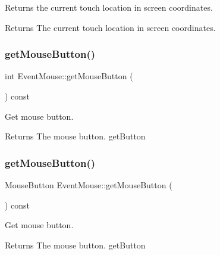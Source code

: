 Returns the current touch location in screen coordinates.

\begin{DoxyReturn}{Returns}
The current touch location in screen coordinates. 
\end{DoxyReturn}
\mbox{\label{classEventMouse_ac1f35c4723f32dbe0c8ccfcb8cc74e54}} 
\subsubsection{\texorpdfstring{get\+Mouse\+Button()}{getMouseButton()}\hspace{0.1cm}{\footnotesize\ttfamily [1/2]}}
{\footnotesize\ttfamily int Event\+Mouse\+::get\+Mouse\+Button (\begin{DoxyParamCaption}{ }\end{DoxyParamCaption}) const\hspace{0.3cm}{\ttfamily [inline]}}

Get mouse button.

\begin{DoxyReturn}{Returns}
The mouse button.  get\+Button 
\end{DoxyReturn}
\mbox{\label{classEventMouse_a5e58891e69bde3193ca51111c106a234}} 
\subsubsection{\texorpdfstring{get\+Mouse\+Button()}{getMouseButton()}\hspace{0.1cm}{\footnotesize\ttfamily [2/2]}}
{\footnotesize\ttfamily Mouse\+Button Event\+Mouse\+::get\+Mouse\+Button (\begin{DoxyParamCaption}{ }\end{DoxyParamCaption}) const\hspace{0.3cm}{\ttfamily [inline]}}

Get mouse button.

\begin{DoxyReturn}{Returns}
The mouse button.  get\+Button 
\end{DoxyReturn}
\mbox{\label{classEventMouse_a3efc2e751febf59f3068305f90cb1acc}} 
